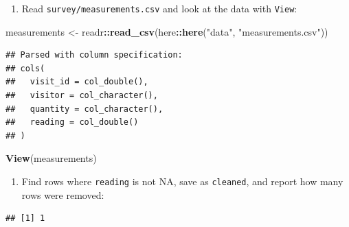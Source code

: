 \documentclass[]{Nemilov}
\newenvironment{Shaded}{\begin{snugshade}}{\end{snugshade}}
\newcommand{\KeywordTok}[1]{\textcolor[rgb]{0.13,0.29,0.53}{\textbf{#1}}}
\newcommand{\NormalTok}[1]{#1}
\newcommand{\OperatorTok}[1]{\textcolor[rgb]{0.81,0.36,0.00}{\textbf{#1}}}
\newcommand{\StringTok}[1]{\textcolor[rgb]{0.31,0.60,0.02}{#1}}
\providecommand{\tightlist}{%
  \setlength{\itemsep}{0pt}\setlength{\parskip}{0pt}}
\begin{document}
\begin{enumerate}
\def\labelenumi{\arabic{enumi}.}
\tightlist
\item
  Read \texttt{survey/measurements.csv} and look at the data with \texttt{View}:
\end{enumerate}

\begin{Shaded}
\begin{Highlighting}[]
\NormalTok{measurements <-}\StringTok{ }\NormalTok{readr}\OperatorTok{::}\KeywordTok{read_csv}\NormalTok{(here}\OperatorTok{::}\KeywordTok{here}\NormalTok{(}\StringTok{"data"}\NormalTok{, }\StringTok{"measurements.csv"}\NormalTok{))}
\end{Highlighting}
\end{Shaded}

\begin{verbatim}
## Parsed with column specification:
## cols(
##   visit_id = col_double(),
##   visitor = col_character(),
##   quantity = col_character(),
##   reading = col_double()
## )
\end{verbatim}

\begin{Shaded}
\begin{Highlighting}[]
\KeywordTok{View}\NormalTok{(measurements)}
\end{Highlighting}
\end{Shaded}

\begin{enumerate}
\def\labelenumi{\arabic{enumi}.}
\setcounter{enumi}{1}
\tightlist
\item
  Find rows where \texttt{reading} is not NA, save as \texttt{cleaned}, and report how many rows were removed:
\end{enumerate}

\begin{Shaded}
\end{Shaded}

\begin{verbatim}
## [1] 1
\end{verbatim}
\end{document}
